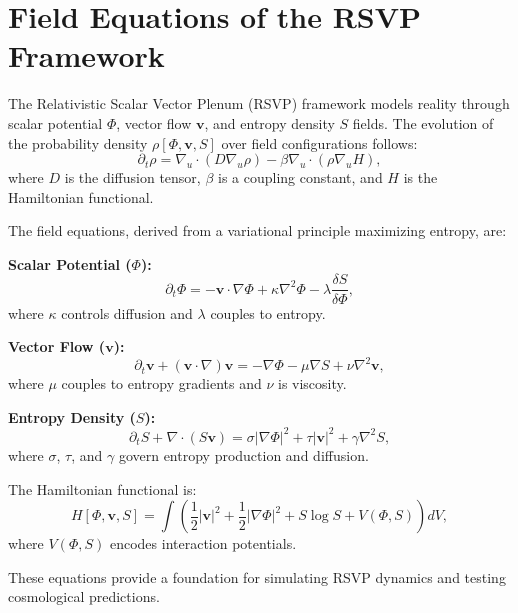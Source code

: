 \documentclass{article}
\begin{document}
\section*{Field Equations of the RSVP Framework}

The Relativistic Scalar Vector Plenum (RSVP) framework models reality through scalar potential \(\Phi\), vector flow \(\mathbf{v}\), and entropy density \(S\) fields. The evolution of the probability density \(\rho[\Phi, \mathbf{v}, S]\) over field configurations follows:
\[
\partial_t \rho = \nabla_u \cdot (D \nabla_u \rho) - \beta \nabla_u \cdot (\rho \nabla_u H),
\]
where \(D\) is the diffusion tensor, \(\beta\) is a coupling constant, and \(H\) is the Hamiltonian functional.

The field equations, derived from a variational principle maximizing entropy, are:

\textbf{Scalar Potential (\(\Phi\)):}
\[
\partial_t \Phi = -\mathbf{v} \cdot \nabla \Phi + \kappa \nabla^2 \Phi - \lambda \frac{\delta S}{\delta \Phi},
\]
where \(\kappa\) controls diffusion and \(\lambda\) couples to entropy.

\textbf{Vector Flow (\(\mathbf{v}\)):}
\[
\partial_t \mathbf{v} + (\mathbf{v} \cdot \nabla) \mathbf{v} = -\nabla \Phi - \mu \nabla S + \nu \nabla^2 \mathbf{v},
\]
where \(\mu\) couples to entropy gradients and \(\nu\) is viscosity.

\textbf{Entropy Density (\(S\)):}
\[
\partial_t S + \nabla \cdot (S \mathbf{v}) = \sigma |\nabla \Phi|^2 + \tau |\mathbf{v}|^2 + \gamma \nabla^2 S,
\]
where \(\sigma\), \(\tau\), and \(\gamma\) govern entropy production and diffusion.

The Hamiltonian functional is:
\[
H[\Phi, \mathbf{v}, S] = \int \left( \frac{1}{2} |\mathbf{v}|^2 + \frac{1}{2} |\nabla \Phi|^2 + S \log S + V(\Phi, S) \right) dV,
\]
where \(V(\Phi, S)\) encodes interaction potentials.

These equations provide a foundation for simulating RSVP dynamics and testing cosmological predictions.
\end{document}
